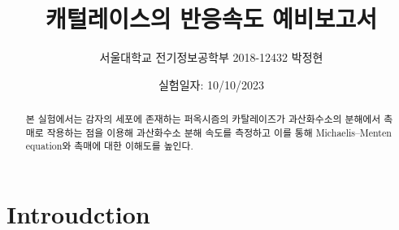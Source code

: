\documentclass[%
 reprint,
 amsmath,amssymb,
 aps,
]{revtex4-2}
\begin{document}
\title{캐털레이스의 반응속도 예비보고서}

\author{서울대학교 전기정보공학부 2018-12432 박정현}
\date{실험일자: 10/10/2023}%

\begin{abstract}
본 실험에서는 감자의 세포에 존재하는 퍼옥시즘의 카탈레이즈가 과산화수소의 분해에서 촉매로 작용하는 점을 이용해 과산화수소 분해 속도를 측정하고 이를 통해 Michaelis–Menten equation와 촉매에 대한 이해도를 높인다.
\end{abstract}

\maketitle


\section{\label{sec:level1}Introudction}
\end{document}
